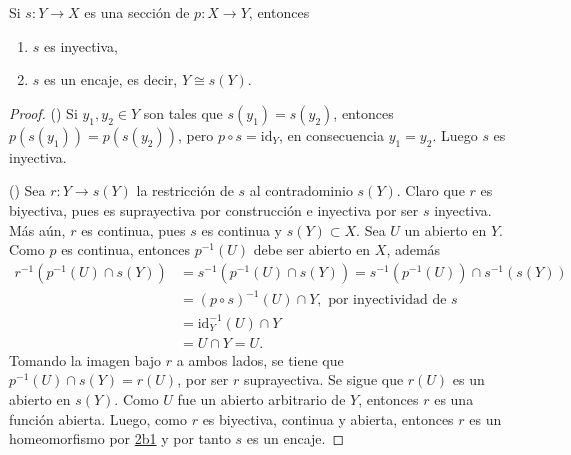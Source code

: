 

\begin{theorem}
Si $s : Y \longrightarrow X$ es una sección de $p : X \longrightarrow Y$, entonces
\begin{enumerate}[label=\textnormal{(\roman*)}]
\item $s$ es inyectiva,
\item $s$ es un encaje, es decir, $Y \cong s(Y)$.
\end{enumerate}
\end{theorem}

\begin{proof}
({\scshape{}}) Si $y_1, y_2 \in Y$ son tales que $s(y_1) = s(y_2)$, entonces $p(s(y_1)) = p(s(y_2))$, pero $p \circ s = \text{id}_Y$, en consecuencia $y_1 = y_2$. Luego $s$ es inyectiva.
\bigskip

({\scshape{}}) Sea $r : Y \longrightarrow s(Y)$ la restricción de $s$ al contradominio $s(Y)$. Claro que $r$ es biyectiva, pues es suprayectiva por construcción e inyectiva por ser $s$ inyectiva. Más aún, $r$ es continua, pues $s$ es continua y $s(Y) \subset X$. Sea $U$ un abierto en $Y$. Como $p$ es continua, entonces $p^{-1}(U)$ debe ser abierto en $X$, además
\begin{align*}
    r^{-1}(p^{-1}(U) \cap s(Y)) &= s^{-1}(p^{-1}(U) \cap s(Y)) = s^{-1}(p^{-1}(U)) \cap s^{-1}(s(Y)) \\
                                &= (p \circ s)^{-1}(U) \cap Y, \text{ por inyectividad de } s \\
                                &= \text{id}^{-1}_Y(U) \cap Y \\
                                &= U \cap Y = U.
\end{align*}
Tomando la imagen bajo $r$ a ambos lados, se tiene que $p^{-1}(U) \cap s(Y) = r(U)$, por ser $r$ suprayectiva. Se sigue que $r(U)$ es un abierto en $s(Y)$. Como $U$ fue un abierto arbitrario de $Y$, entonces $r$ es una función abierta. Luego, como $r$ es biyectiva, continua y abierta, entonces $r$ es un homeomorfismo por \hyperref[card:2b1]{\textsf{2b1}} y por tanto $s$ es un encaje.
\end{proof}
